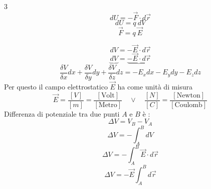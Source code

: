 \documentclass[twoside]{article}
\begin{document}
\begin{multicols}{3}
    \noindent
    \begin{equation*}
        dU = -\vec{F} \cdot d\vec{r}
    \end{equation*}
    \columnbreak
    \noindent
    \begin{equation*}
        dU = q\ dV
    \end{equation*}
    \columnbreak
    \noindent
    \begin{equation*}
        \vec{F} = q\ \vec{E}
    \end{equation*}
\end{multicols}
\begin{equation}
    \boxed{dV = -\vec{E} \cdot d\vec{r}}
\end{equation}
\begin{equation*}
    \underbrace{dV} = \underbrace{-\vec{E} \cdot d\vec{r}}
\end{equation*}
\begin{equation*}
    \frac{\delta V}{\delta x} dx + \frac{\delta V}{\delta y} dy + \frac{\delta V}{\delta z} dz = -E_x dx - E_y dy - E_z dz
\end{equation*}
Per questo il campo elettrostatico \(\vec{E}\) ha come unità di misura
\begin{equation*}
    \vec{E} = \frac{\left[V\right]}{\left[m\right]} = \frac{\left[\text{Volt}\right]}{\left[\text{Metro}\right]} \quad \lor \quad \frac{\left[N\right]}{\left[C\right]} = \frac{\left[\text{Newton}\right]}{\left[\text{Coulomb}\right]}
\end{equation*}
Differenza di potenziale tra due punti \(A\) e \(B\) è :
\begin{equation*}
    \Delta V = V_B - V_A
\end{equation*}
\begin{equation*}
    \Delta V = -\displaystyle \int_{A}^{B} dV
\end{equation*}
\begin{equation}
    \boxed{\Delta V = -\displaystyle \int_{A}^{B} \vec{E} \cdot d\vec{r}}
\end{equation}
\begin{equation*}
    \boxed{\Delta V = -\vec{E} \int_{A}^{B} d\vec{r}}
\end{equation*}
\end{document}
